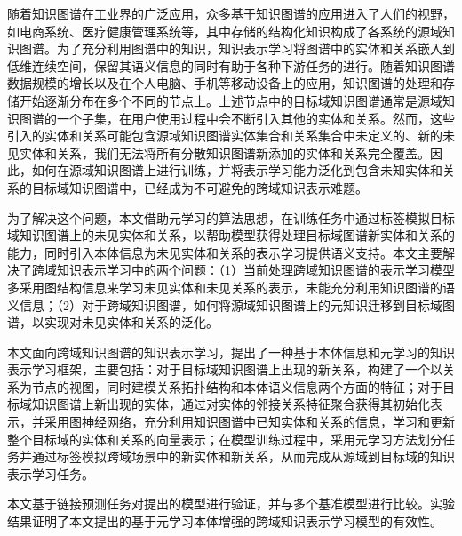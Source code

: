 随着知识图谱在工业界的广泛应用，众多基于知识图谱的应用进入了人们的视野，如电商系统、医疗健康管理系统等，其中存储的结构化知识构成了各系统的源域知识图谱。为了充分利用图谱中的知识，知识表示学习将图谱中的实体和关系嵌入到低维连续空间，保留其语义信息的同时有助于各种下游任务的进行。随着知识图谱数据规模的增长以及在个人电脑、手机等移动设备上的应用，知识图谱的处理和存储开始逐渐分布在多个不同的节点上。上述节点中的目标域知识图谱通常是源域知识图谱的一个子集，在用户使用过程中会不断引入其他的实体和关系。然而，这些引入的实体和关系可能包含源域知识图谱实体集合和关系集合中未定义的、新的未见实体和关系，我们无法将所有分散知识图谱新添加的实体和关系完全覆盖。因此，如何在源域知识图谱上进行训练，并将表示学习能力泛化到包含未知实体和关系的目标域知识图谱中，已经成为不可避免的跨域知识表示难题。

为了解决这个问题，本文借助元学习的算法思想，在训练任务中通过标签模拟目标域知识图谱上的未见实体和关系，以帮助模型获得处理目标域图谱新实体和关系的能力，同时引入本体信息为未见实体和关系的表示学习提供语义支持。本文主要解决了跨域知识表示学习中的两个问题：（1）当前处理跨域知识图谱的表示学习模型多采用图结构信息来学习未见实体和未见关系的表示，未能充分利用知识图谱的语义信息；（2）对于跨域知识图谱，如何将源域知识图谱上的元知识迁移到目标域图谱，以实现对未见实体和关系的泛化。

本文面向跨域知识图谱的知识表示学习，提出了一种基于本体信息和元学习的知识表示学习框架，主要包括：对于目标域知识图谱上出现的新关系，构建了一个以关系为节点的视图，同时建模关系拓扑结构和本体语义信息两个方面的特征；对于目标域知识图谱上新出现的实体，通过对实体的邻接关系特征聚合获得其初始化表示，并采用图神经网络，充分利用知识图谱中已知实体和关系的信息，学习和更新整个目标域的实体和关系的向量表示；在模型训练过程中，采用元学习方法划分任务并通过标签模拟跨域场景中的新实体和新关系，从而完成从源域到目标域的知识表示学习任务。

本文基于链接预测任务对提出的模型进行验证，并与多个基准模型进行比较。实验结果证明了本文提出的基于元学习本体增强的跨域知识表示学习模型的有效性。
